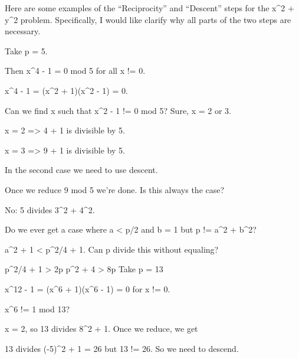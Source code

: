 Here are some examples of the ``Reciprocity'' and ``Descent'' steps for the x^2 + y^2 problem. Specifically, I would like clarify why all parts of the two steps are necessary.

Take p = 5.

Then x^4 - 1 = 0 mod 5 for all x != 0.

x^4 - 1 = (x^2 + 1)(x^2 - 1) = 0.

Can we find x such that x^2 - 1 != 0 mod 5? Sure, x = 2 or 3.

x = 2 => 4 + 1 is divisible by 5.

x = 3 => 9 + 1 is divisible by 5.

In the second case we need to use descent.

Once we reduce 9 mod 5 we're done. Is this always the case?

No: 5 divides 3^2 + 4^2.

Do we ever get a case where a < p/2 and b = 1 but p != a^2 + b^2?

a^2 + 1 < p^2/4 + 1. Can p divide this without equaling?

p^2/4 + 1 > 2p
p^2 + 4 > 8p
Take p = 13

x^12 - 1 = (x^6 + 1)(x^6 - 1) = 0 for x != 0.

x^6 != 1 mod 13?

x = 2, so 13 divides 8^2 + 1. Once we reduce, we get

13 divides (-5)^2 + 1 = 26 but 13 != 26. So we need to descend.
